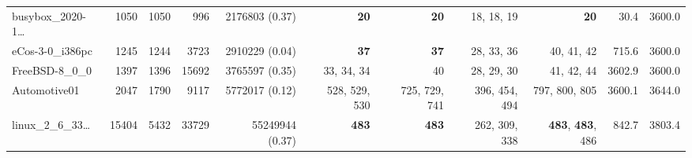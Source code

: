 \begin{table*}
\begin{tiny}
{\begin{tabular}{lrrrrrrrrrr}
busybox\_2020-1\ldots & \num[text-series-to-math=true]{1050} & \num[text-series-to-math=true]{1050} & \num[text-series-to-math=true]{996} & \num[text-series-to-math=true]{2176803} (\num[text-series-to-math=true]{0.37}) & \textbf{\num[text-series-to-math=true]{20}} & \textbf{\num[text-series-to-math=true]{20}} & \num[text-series-to-math=true]{18}, \num[text-series-to-math=true]{18}, \num[text-series-to-math=true]{19} & \textbf{\num[text-series-to-math=true]{20}} & 30.4 & 3600.0\\
eCos-3-0\_i386pc & \num[text-series-to-math=true]{1245} & \num[text-series-to-math=true]{1244} & \num[text-series-to-math=true]{3723} & \num[text-series-to-math=true]{2910229} (\num[text-series-to-math=true]{0.04}) & \textbf{\num[text-series-to-math=true]{37}} & \textbf{\num[text-series-to-math=true]{37}} & \num[text-series-to-math=true]{28}, \num[text-series-to-math=true]{33}, \num[text-series-to-math=true]{36} & \num[text-series-to-math=true]{40}, \num[text-series-to-math=true]{41}, \num[text-series-to-math=true]{42} & 715.6 & 3600.0\\
FreeBSD-8\_0\_0 & \num[text-series-to-math=true]{1397} & \num[text-series-to-math=true]{1396} & \num[text-series-to-math=true]{15692} & \num[text-series-to-math=true]{3765597} (\num[text-series-to-math=true]{0.35}) & \num[text-series-to-math=true]{33}, \num[text-series-to-math=true]{34}, \num[text-series-to-math=true]{34} & \num[text-series-to-math=true]{40} & \num[text-series-to-math=true]{28}, \num[text-series-to-math=true]{29}, \num[text-series-to-math=true]{30} & \num[text-series-to-math=true]{41}, \num[text-series-to-math=true]{42}, \num[text-series-to-math=true]{44} & 3602.9 & 3600.0\\
Automotive01 & \num[text-series-to-math=true]{2047} & \num[text-series-to-math=true]{1790} & \num[text-series-to-math=true]{9117} & \num[text-series-to-math=true]{5772017} (\num[text-series-to-math=true]{0.12}) & \num[text-series-to-math=true]{528}, \num[text-series-to-math=true]{529}, \num[text-series-to-math=true]{530} & \num[text-series-to-math=true]{725}, \num[text-series-to-math=true]{729}, \num[text-series-to-math=true]{741} & \num[text-series-to-math=true]{396}, \num[text-series-to-math=true]{454}, \num[text-series-to-math=true]{494} & \num[text-series-to-math=true]{797}, \num[text-series-to-math=true]{800}, \num[text-series-to-math=true]{805} & 3600.1 & 3644.0\\
linux\_2\_6\_33\ldots & \num[text-series-to-math=true]{15404} & \num[text-series-to-math=true]{5432} & \num[text-series-to-math=true]{33729} & \num[text-series-to-math=true]{55249944} (\num[text-series-to-math=true]{0.37}) & \textbf{\num[text-series-to-math=true]{483}} & \textbf{\num[text-series-to-math=true]{483}} & \num[text-series-to-math=true]{262}, \num[text-series-to-math=true]{309}, \num[text-series-to-math=true]{338} & \textbf{\num[text-series-to-math=true]{483}}, \textbf{\num[text-series-to-math=true]{483}}, \num[text-series-to-math=true]{486} & 842.7 & 3803.4\\

\end{tabular}}
\end{tiny}
\end{table*}
